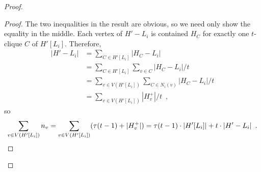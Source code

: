 \documentclass[kpfonts]{patmorin}
\theoremstyle{named}
\begin{document}
\begin{proof}
    \begin{proof}
        The two inequalities in the result are obvious, so we need only show the equality in the middle.
        Each vertex of $H'-L_i$ is contained $H_C$ for exactly one $t$-clique $C$ of $H'[L_i]$.  Therefore,
        \begin{align*}
            |H'-L_i|
            & = \sum_{C\in H'[L_i]} |H_C-L_i| \\
            & = \sum_{C\in H'[L_i]}\sum_{v\in C} |H_C-L_i|/t \\
            & = \sum_{v\in V(H'[L_i])}\sum_{C\in N_i(v)} |H_C-L_i|/t \\
            & = \sum_{v\in V(H'[L_i])}|H^+_v|/t \enspace ,
        \end{align*}
        so
        \[  \sum_{v\in V(H'[L_i])} n_v = \sum_{v\in V(H'[L_i])}(\tau(t-1)+|H^+_v|)
          = \tau(t-1)\cdot|H'[L_i]| + t\cdot|H'-L_i| \enspace . \qedhere
        \]
    \end{proof}




\end{proof}
\end{document}
